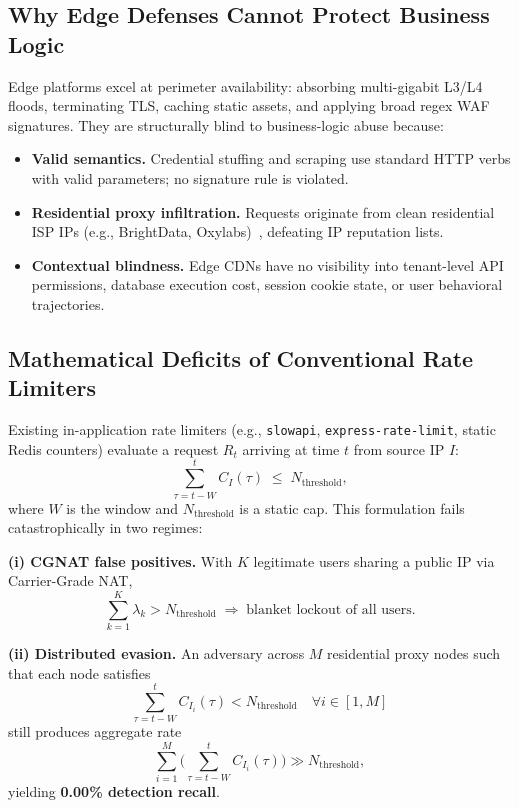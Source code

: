 \documentclass[journal,10pt]{IEEEtran}
\begin{document}
\subsection{Why Edge Defenses Cannot Protect Business Logic}
Edge platforms excel at perimeter availability: absorbing multi-gigabit L3/L4 floods, terminating TLS, caching static assets, and applying broad regex WAF signatures. They are structurally blind to business-logic abuse because:
\begin{itemize}
    \item \textbf{Valid semantics.} Credential stuffing and scraping use standard HTTP verbs with valid parameters; no signature rule is violated.
    \item \textbf{Residential proxy infiltration.} Requests originate from clean residential ISP IPs (e.g., BrightData, Oxylabs)~\cite{mi2019resident}, defeating IP reputation lists.
    \item \textbf{Contextual blindness.} Edge CDNs have no visibility into tenant-level API permissions, database execution cost, session cookie state, or user behavioral trajectories.
\end{itemize}

\subsection{Mathematical Deficits of Conventional Rate Limiters}
Existing in-application rate limiters (e.g., \texttt{slowapi}, \texttt{express-rate-limit}, static Redis counters) evaluate a request $R_t$ arriving at time $t$ from source IP $I$:
\begin{equation}
\sum_{\tau=t-W}^{t} C_I(\tau) \;\le\; N_{\mathrm{threshold}},
\label{eq:baseline}
\end{equation}
where $W$ is the window and $N_{\mathrm{threshold}}$ is a static cap. This formulation fails catastrophically in two regimes:

\textbf{(i) CGNAT false positives.} With $K$ legitimate users sharing a public IP via Carrier-Grade NAT,
\begin{equation}
\sum_{k=1}^{K}\lambda_k > N_{\mathrm{threshold}}
\;\Longrightarrow\;
\text{blanket lockout of all users.}
\end{equation}

\textbf{(ii) Distributed evasion.} An adversary across $M$ residential proxy nodes such that each node satisfies
\begin{equation}
\sum_{\tau=t-W}^{t}C_{I_i}(\tau) < N_{\mathrm{threshold}} \quad \forall i\in[1,M]
\end{equation}
still produces aggregate rate
\begin{equation}
\sum_{i=1}^{M}\!\Big(\!\sum_{\tau=t-W}^{t}C_{I_i}(\tau)\!\Big) \gg N_{\mathrm{threshold}},
\end{equation}
yielding \textbf{0.00\% detection recall}.
\end{document}
